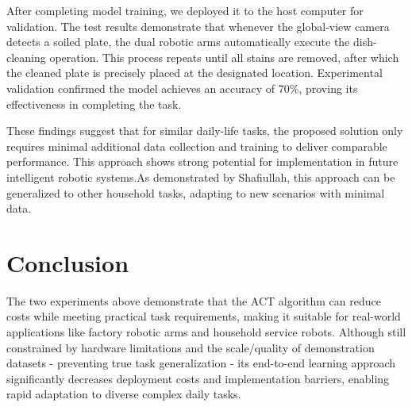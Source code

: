 \documentclass[runningheads]{llncs}
\begin{document}
After completing model training, we deployed it to the host computer for validation. The test results demonstrate that whenever the global-view camera detects a soiled plate, the dual robotic arms automatically execute the dish-cleaning operation. This process repeats until all stains are removed, after which the cleaned plate is precisely placed at the designated location. Experimental validation confirmed the model achieves an accuracy of 70\%, proving its effectiveness in completing the task.

These findings suggest that for similar daily-life tasks, the proposed solution only requires minimal additional data collection and training to deliver comparable performance. This approach shows strong potential for implementation in future intelligent robotic systems.As demonstrated by Shafiullah\cite{ref17}, this approach can be generalized to other household tasks, adapting to new scenarios with minimal data.


\section{Conclusion}
The two experiments above demonstrate that the ACT algorithm can reduce costs while meeting practical task requirements, making it suitable for real-world applications like factory robotic arms and household service robots. Although still constrained by hardware limitations and the scale/quality of demonstration datasets - preventing true task generalization - its end-to-end learning approach significantly decreases deployment costs and implementation barriers, enabling rapid adaptation to diverse complex daily tasks.




\end{document}

